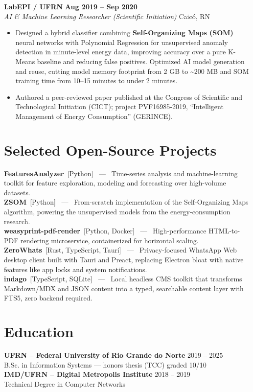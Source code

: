 \documentclass[11pt,a4paper]{article}
\newcommand{\role}[4]{%
  \needspace{5\baselineskip}%
  \textbf{#1} \hfill \textbf{#3} \\[2pt]
  \textit{#2} \hfill \textcolor{muted}{#4}\\[4pt]
}
\newcommand{\project}[3]{%
  \textbf{#1} \,\textcolor{muted}{\small[#2]} \, --- \, #3 \\[3pt]
}
\begin{document}
\role{LabEPI / UFRN}{AI \& Machine Learning Researcher (Scientific Initiation)}{Aug 2019 -- Sep 2020}{Caic\'o, RN}
\begin{itemize}[leftmargin=14pt, itemsep=2pt, topsep=0pt]
    \item Designed a hybrid classifier combining \textbf{Self-Organizing Maps (SOM)} neural networks with Polynomial Regression for unsupervised anomaly detection in minute-level energy data, improving accuracy over a pure K-Means baseline and reducing false positives. Optimized AI model generation and reuse, cutting model memory footprint from 2 GB to \textasciitilde200 MB and SOM training time from 10--15 minutes to under 2 minutes.
    \item Authored a peer-reviewed paper published at the Congress of Scientific and Technological Initiation (CICT); project PVF16985-2019, ``Intelligent Management of Energy Consumption'' (GERINCE).
\end{itemize}

\section{Selected Open-Source Projects}

\project{FeaturesAnalyzer}{Python}{Time-series analysis and machine-learning toolkit for feature exploration, modeling and forecasting over high-volume datasets.}
\project{ZSOM}{Python}{From-scratch implementation of the Self-Organizing Maps algorithm, powering the unsupervised models from the energy-consumption research.}
\project{weasyprint-pdf-render}{Python, Docker}{High-performance HTML-to-PDF rendering microservice, containerized for horizontal scaling.}
\project{ZeroWhats}{Rust, TypeScript, Tauri}{Privacy-focused WhatsApp Web desktop client built with Tauri and Preact, replacing Electron bloat with native features like app locks and system notifications.}
\project{indago}{TypeScript, SQLite}{Local headless CMS toolkit that transforms Markdown/MDX and JSON content into a typed, searchable content layer with FTS5, zero backend required.}
\vspace{-10pt}

\section{Education}
\textbf{UFRN -- Federal University of Rio Grande do Norte} \hfill 2019 -- 2025 \\
B.Sc. in Information Systems --- honors thesis (TCC) graded 10/10 \\[6pt]
\textbf{IMD/UFRN -- Digital Metropolis Institute} \hfill 2018 -- 2019 \\
Technical Degree in Computer Networks
\end{document}
